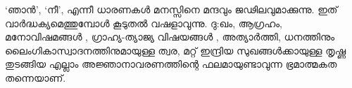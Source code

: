 ‘ഞാന്‍’, ‘നീ’, എന്നീ ധാരണകള്‍ മനസ്സിനെ മന്ദവും ജഢിലവുമാക്കുന്നു. ഇത് വാര്‍ദ്ധക്യമെത്തുമ്പോള്‍ കൂടുതല്‍ വഷളാവുന്നു. ദു:ഖം, ആഗ്രഹം, മനോവിഷമങ്ങള്‍ , ഗ്രാഹ്യ-ത്യാജ്യ വിഷയങ്ങള്‍ , അത്യാര്‍ത്തി, ധനത്തിനും ലൈംഗികാസ്വാദനത്തിനുമായുള്ള ത്വര, മറ്റ്‌ ഇന്ദ്രിയ സുഖങ്ങള്‍ക്കായുള്ള തൃഷ്ണ തുടങ്ങിയ എല്ലാം അജ്ഞാനാവരണത്തിന്റെ ഫലമായുണ്ടാവുന്ന ഭ്രമാത്മകത തന്നെയാണ്.